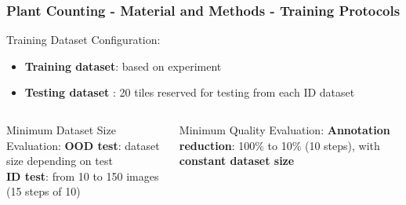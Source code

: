 \documentclass[aspectratio=43]{beamer}
\begin{document}
\begin{frame}
    \frametitle{\small Plant Counting - Material and Methods - Training Protocols}
  
    \begin{block}{Training Dataset Configuration:}
        \small
        \begin{itemize}
            \item \textbf{Training dataset}: based on experiment
            \item \textbf{Testing dataset }: 20 tiles reserved for testing from each ID dataset
        \end{itemize}
    \end{block}
    
    \begin{columns}
        \begin{column}{0.4\textwidth}
            \begin{block}{Minimum Dataset Size Evaluation:}
                \scriptsize
                \textbf{OOD test}: dataset size depending on test\\
                \textbf{ID test}: from 10 to 150 images (15 steps of 10)
            \end{block}
        \end{column}
        
        \begin{column}{0.4\textwidth}
            \begin{block}{Minimum Quality Evaluation:}
                \scriptsize
                \textbf{Annotation reduction}: 100\% to 10\% (10 steps), with \textbf{constant dataset size}
            \end{block}
        \end{column}
    \end{columns}
\end{frame}
\end{document}
